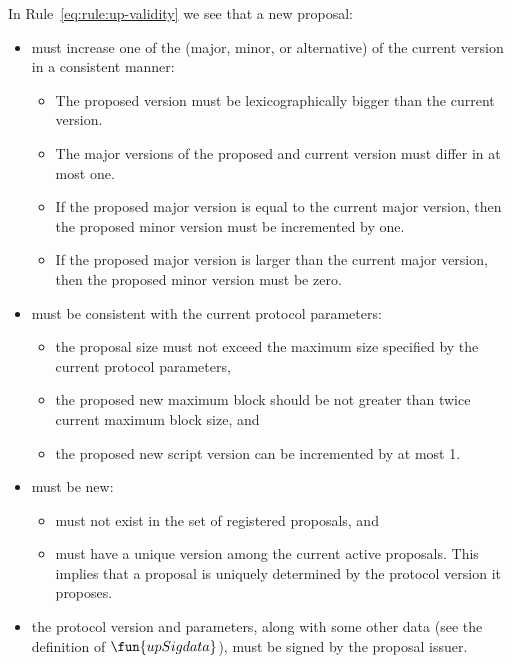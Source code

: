 In Rule~\ref{eq:rule:up-validity} we see that a new proposal:
\begin{itemize}
\item must increase one of the (major, minor, or alternative) of the
  current version in a consistent manner:
  \begin{itemize}
  \item The proposed version must be lexicographically bigger than the current
    version.
  \item The major versions of the proposed and current version must differ in
    at most one.
  \item If the proposed major version is equal to the current major
    version, then the proposed minor version must be incremented by one.
  \item If the proposed major version is larger than the current major version,
    then the proposed minor version must be zero.
  \end{itemize}
\item must be consistent with the current protocol parameters:
  \begin{itemize}
  \item the proposal size must not exceed the maximum size specified by
    the current protocol parameters,
  \item the proposed new maximum block should be not greater than twice current
    maximum block size, and
  \item the proposed new script version can be incremented by at most 1.
  \end{itemize}
\item must be new:
  \begin{itemize}
  \item must not exist in the set of registered proposals, and
  \item must have a unique version among the current active proposals. This
    implies that a proposal is uniquely determined by the protocol version it
    proposes.
  \end{itemize}
\item the protocol version and parameters, along with some other data (see the
  definition of $\fun{upSigdata}$), must be signed by the proposal issuer.
\end{itemize}

